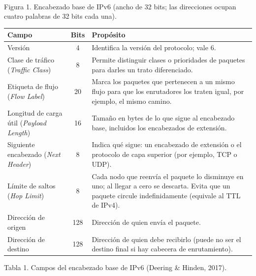 \documentclass[12pt,letterpaper]{article}
\begin{document}
\begin{center}
\\[3pt]
{\footnotesize Figura 1. Encabezado base de IPv6 (ancho de 32 bits; las direcciones ocupan cuatro palabras de 32 bits cada una).}
\end{center}


\newpage
{\small
\renewcommand{\arraystretch}{1.12}
\begin{longtable}[c]{|>{\raggedright\arraybackslash}p{3.4cm}|c|>{\raggedright\arraybackslash}p{8.2cm}|}
\hline
\textbf{Campo} & \textbf{Bits} & \textbf{Propósito}\\
\hline
Versión & 4 & Identifica la versión del protocolo; vale 6.\\ \hline
Clase de tráfico (\emph{Traffic Class}) & 8 & Permite distinguir clases o prioridades de paquetes para darles un trato diferenciado.\\ \hline
Etiqueta de flujo (\emph{Flow Label}) & 20 & Marca los paquetes que pertenecen a un mismo flujo para que los enrutadores los traten igual, por ejemplo, el mismo camino.\\ \hline
Longitud de carga útil (\emph{Payload Length}) & 16 & Tamaño en bytes de lo que sigue al encabezado base, incluidos los encabezados de extensión.\\ \hline
Siguiente encabezado (\emph{Next Header}) & 8 & Indica qué sigue: un encabezado de extensión o el protocolo de capa superior (por ejemplo, TCP o UDP).\\ \hline
Límite de saltos (\emph{Hop Limit}) & 8 & Cada nodo que reenvía el paquete lo disminuye en uno; al llegar a cero se descarta. Evita que un paquete circule indefinidamente (equivale al TTL de IPv4).\\ \hline
Dirección de origen & 128 & Dirección de quien envía el paquete.\\ \hline
Dirección de destino & 128 & Dirección de quien debe recibirlo (puede no ser el destino final si hay cabecera de enrutamiento).\\ \hline
\end{longtable}
\vspace{-8pt}\begin{center}{\footnotesize Tabla 1. Campos del encabezado base de IPv6 (Deering \& Hinden, 2017).}\end{center}}
\end{document}
